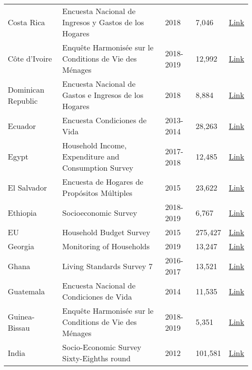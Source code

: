 \begin{ThreePartTable}
\begin{longtable}[t]{l|p{8cm}|l|l|l}
        Costa Rica & Encuesta Nacional de Ingresos y Gastos de los Hogares & 2018 &  7,046  & \href{https://inec.cr/estadisticas-fuentes/encuestas/encuesta-nacional-ingresos-gastos-los-hogares}{Link} \\ 
        Côte d'Ivoire & Enquête Harmonisée sur le Conditions de Vie des Ménages & 2018-2019 &  12,992  & \href{https://microdata.worldbank.org/index.php/catalog/4292/study-description}{Link} \\ 
        Dominican Republic & Encuesta Nacional de Gastos e Ingresos de los Hogares & 2018 &  8,884  & \href{https://archivo.one.gob.do/encuestas/enigh}{Link} \\ 
        Ecuador & Encuesta Condiciones de Vida & 2013-2014 &  28,263  & \href{https://aplicaciones3.ecuadorencifras.gob.ec/BIINEC-war/index.xhtml}{Link} \\ 
        Egypt & Household Income, Expenditure and Consumption Survey & 2017-2018 &  12,485  & \href{http://www.erfdataportal.com/index.php/catalog/129}{Link} \\ 
        El Salvador & Encuesta de Hogares de Propósitos Múltiples & 2015 &  23,622  & \href{http://www.digestyc.gob.sv/index.php/temas/des/ehpm.html}{Link} \\ 
        Ethiopia & Socioeconomic Survey & 2018-2019 &  6,767  & \href{https://microdata.worldbank.org/index.php/catalog/3823}{Link} \\ 
        EU & Household Budget Survey & 2015 &  275,427  & \href{https://ec.europa.eu/eurostat/web/microdata/household-budget-survey}{Link} \\ 
        Georgia & Monitoring of Households & 2019 &  13,247  & \href{https://www.geostat.ge/en/modules/categories/128/databases-of-2009-2016-integrated-household-survey-and-2017-households-income-and-expenditure-survey}{Link} \\ 
        Ghana & Living Standards Survey 7 & 2016-2017 &  13,521  & \href{https://www2.statsghana.gov.gh/nada/index.php/catalog/97/study-description}{Link} \\ 
        Guatemala & Encuesta Nacional de Condiciones de Vida & 2014 &  11,535  & \href{https://www.proyectoencovi.com/}{Link} \\ 
        Guinea-Bissau & Enquête Harmonisée sur le Conditions de Vie des Ménages & 2018-2019 &  5,351  & \href{https://microdata.worldbank.org/index.php/catalog/4293}{Link} \\ 
        India & Socio-Economic Survey Sixty-Eighths round & 2012 &  101,581  & \href{https://catalog.ihsn.org/index.php/catalog/3281}{Link} \\ 

\end{longtable}
\end{ThreePartTable}
